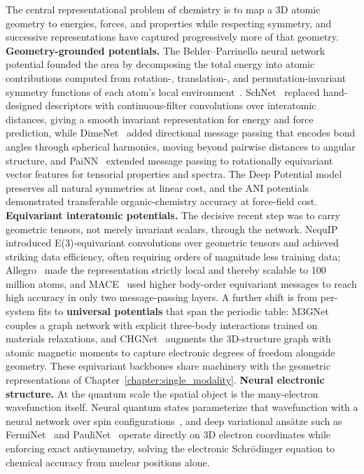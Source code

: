 The central representational problem of chemistry is to map a 3D atomic geometry to energies, forces, and properties while respecting symmetry, and successive representations have captured progressively more of that geometry.
\textbf{Geometry-grounded potentials.} The Behler--Parrinello neural network potential founded the area by decomposing the total energy into atomic contributions computed from rotation-, translation-, and permutation-invariant symmetry functions of each atom's local environment~\cite{behler2007generalized}.
SchNet~\cite{schutt2017schnet} replaced hand-designed descriptors with continuous-filter convolutions over interatomic distances, giving a smooth invariant representation for energy and force prediction, while DimeNet~\cite{klicpera2020directional} added directional message passing that encodes bond angles through spherical harmonics, moving beyond pairwise distances to angular structure, and PaiNN~\cite{schutt2021equivariant} extended message passing to rotationally equivariant vector features for tensorial properties and spectra.
The Deep Potential model~\cite{zhang2018deep} preserves all natural symmetries at linear cost, and the ANI potentials~\cite{smith2017ani} demonstrated transferable organic-chemistry accuracy at force-field cost.
\textbf{Equivariant interatomic potentials.} The decisive recent step was to carry geometric tensors, not merely invariant scalars, through the network.
NequIP~\cite{batzner2022e3} introduced E(3)-equivariant convolutions over geometric tensors and achieved striking data efficiency, often requiring orders of magnitude less training data; Allegro~\cite{musaelian2023learning} made the representation strictly local and thereby scalable to 100 million atoms, and MACE~\cite{batatia2022mace} used higher body-order equivariant messages to reach high accuracy in only two message-passing layers.
A further shift is from per-system fits to \textbf{universal potentials} that span the periodic table: M3GNet~\cite{chen2022universal} couples a graph network with explicit three-body interactions trained on materials relaxations, and CHGNet~\cite{deng2023chgnet} augments the 3D-structure graph with atomic magnetic moments to capture electronic degrees of freedom alongside geometry. These equivariant backbones share machinery with the geometric representations of Chapter~\ref{chapter:single_modality}.
\textbf{Neural electronic structure.} At the quantum scale the spatial object is the many-electron wavefunction itself.
Neural quantum states parameterize that wavefunction with a neural network over spin configurations~\cite{carleo2017solving}, and deep variational ans\"atze such as FermiNet~\cite{pfau2020ferminet} and PauliNet~\cite{hermann2020deep} operate directly on 3D electron coordinates while enforcing exact antisymmetry, solving the electronic Schr\"odinger equation to chemical accuracy from nuclear positions alone.

